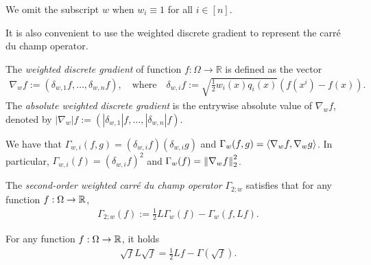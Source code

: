 We omit the subscript $w$ when $w_i \equiv 1$ for all $i \in [n]$.

It is also convenient to use the weighted discrete gradient to represent the carr\'e du champ operator.


\begin{definition}\label{def:weighted-gradient}
    The \textit{weighted discrete gradient} of function $f: \Omega \to \mathbb{R}$ is defined as the vector 
    \begin{align*}
        \nabla_w f := (\delta_{w,1} f, \ldots, \delta_{w,n} f),\quad \text{where} \quad \delta_{w,i} f := \sqrt{\frac 12w_i(x)q_i(x)}(f(x^i) - f(x)).
    \end{align*}
    The \textit{absolute weighted discrete gradient} is the entrywise absolute value of $\nabla_w f$, denoted by $|\nabla_w| f := (|\delta_{w,1}| f, \ldots, |\delta_{w,n}| f)$.
\end{definition}

\begin{fact}
    We have that $\Gamma_{w,i}(f,g) = (\delta_{w,i} f) (\delta_{w,i} g)$ and $\Gamma_w(f,g) = \left\langle \nabla_w f,\nabla_w g\right\rangle$.
    In particular, $\Gamma_{w,i}(f) = (\delta_{w,i} f)^2$ and $\Gamma_w(f) = \left\lVert \nabla_w f \right\rVert_2^2$.
\end{fact}





\begin{definition}
    The \textit{second-order weighted carr\'e du champ operator} $\Gamma_{2;w}$ satisfies that for any function $f:\Omega \to \mathbb{R}$,
    \begin{align*}
        \Gamma_{2;w}(f) := \frac 12 L\Gamma_w(f) - \Gamma_w(f,Lf).
    \end{align*}
\end{definition}

\begin{lemma}
\label{lem:chain-rule}
    For any function $f: \Omega \to \mathbb{R}$, it holds
    \begin{align*}
        \sqrt{f} L \sqrt{f} = \frac{1}{2} L f - \Gamma(\sqrt{f}).
    \end{align*}
\end{lemma}

